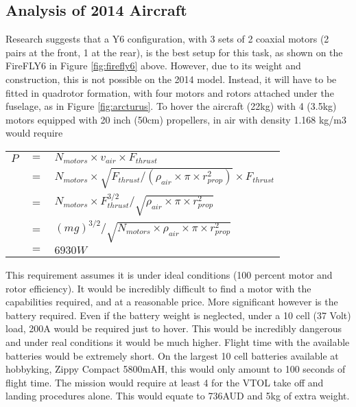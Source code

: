\label{sec:AppA}

\subsection{Analysis of 2014 Aircraft}
\label{sec:lastYear}
Research  suggests that a Y6 configuration, with 3 sets of 2 coaxial motors (2 pairs at the front, 1 at the rear), is the best setup for this task, as shown on the FireFLY6 in Figure \ref{fig:firefly6} above. However, due to its weight and construction, this is not possible on the 2014 model. Instead, it will have to be fitted in quadrotor formation, with four motors and rotors attached under the fuselage, as in Figure \ref{fig:arcturus}. To hover the aircraft (22kg) with 4 (3.5kg) motors equipped with 20 inch (50cm) propellers, in air with density 1.168 kg/m3 would require\\

\begin{tabular}{r c l}
	$P$ & $=$ & $N_{motors} \times v_{air} \times F_{thrust}$\\
	& $=$ & $N_{motors} \times \sqrt{F_{thrust}/(\rho_{air} \times \pi \times r_{prop}^2)} \times F_{thrust}$\\
	& $=$ & $N_{motors} \times F_{thrust}^{3/2}/\sqrt{\rho_{air} \times \pi \times r_{prop}^2}$\\
	& $=$ & $(mg)^{3/2}/\sqrt{N_{motors} \times \rho_{air} \times \pi \times r_{prop}^2}$\\
	& $=$ & $6930W$\\
\end{tabular}
\vspace{6pt}
	
This requirement assumes it is under ideal conditions (100 percent motor and rotor efficiency). It would be incredibly difficult to find a motor with the capabilities required, and at a reasonable price. More significant however is the battery required. Even if the battery weight is neglected, under a 10 cell (37 Volt) load, 200A would be required just to hover. This would be incredibly dangerous and under real conditions it would be much higher. Flight time with the available batteries would be extremely short. On the largest 10 cell batteries available at hobbyking, Zippy Compact 5800mAH, this would only amount to 100 seconds of flight time. The mission would require at least 4 for the VTOL take off and landing procedures alone. This would equate to 736AUD and 5kg of extra weight.\\

